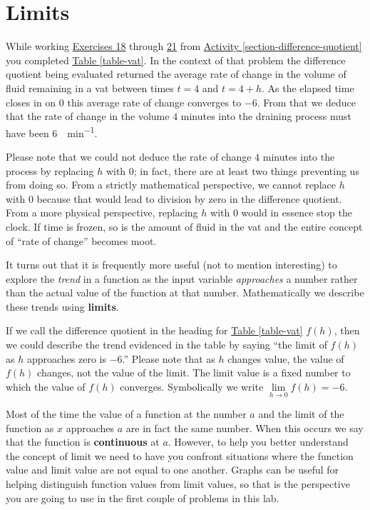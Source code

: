 \documentclass[10pt,oneside,]{book}
\newcommand{\terminology}[1]{\textbf{#1}}
\theoremstyle{plain}
\theoremstyle{definition}
\numberwithin{equation}{section}
\newcommand{\fe}[2]{#1\mathopen{}\left(#2\right)\mathclose{}}
\begin{document}
\section[Limits]{Limits}\label{section-limits}
While working \hyperlink{exercise-vat-first}{Exercises 18} through \hyperlink{exercise-vat-last}{21} from \hyperref[section-difference-quotient]{Activity \ref{section-difference-quotient}} you completed \hyperref[table-vat]{Table \ref{table-vat}}. In the context of that problem the difference quotient being evaluated returned the average rate of change in the volume of fluid remaining in a vat between times \(t=4\) and \(t=4+h\). As the elapsed time closes in on \(0\) this average rate of change converges to \(-6\). From that we deduce that the rate of change in the volume \(4\) minutes into the draining process must have been \SI{6}{\gallon\per\minute}.%
\par
Please note that we could not deduce the rate of change \(4\) minutes into the process by replacing \(h\) with \(0\); in fact, there are at least two things preventing us from doing so. From a strictly mathematical perspective, we cannot replace \(h\) with \(0\) because that would lead to division by zero in the difference quotient. From a more physical perspective, replacing \(h\) with \(0\) would in essence stop the clock. If time is frozen, so is the amount of fluid in the vat and the entire concept of ``rate of change'' becomes moot.%
\par
It turns out that it is frequently more useful (not to mention interesting) to explore the \emph{trend} in a function as the input variable \emph{approaches} a number rather than the actual value of the function at that number. Mathematically we describe these trends using \terminology{limits}.%
\par
If we call the difference quotient in the heading for \hyperref[table-vat]{Table \ref{table-vat}} \(\fe{f}{h}\), then we could describe the trend evidenced in the table by saying ``the limit of \(\fe{f}{h}\) as \(h\) approaches zero is \(-6\).'' Please note that as \(h\) changes value, the value of \(\fe{f}{h}\) changes, not the value of the limit. The limit value is a fixed number to which the value of \(\fe{f}{h}\) converges. Symbolically we write \(\lim\limits_{h\to0}\fe{f}{h}=-6\).%
\par
Most of the time the value of a function at the number \(a\) and the limit of the function as \(x\) approaches \(a\) are in fact the same number. When this occurs we say that the function is \terminology{continuous} at \(a\). However, to help you better understand the concept of limit we need to have you confront situations where the function value and limit value are not equal to one another. Graphs can be useful for helping distinguish function values from limit values, so that is the perspective you are going to use in the first couple of problems in this lab.%
\typeout{************************************************}
\typeout{************************************************}
\end{document}

